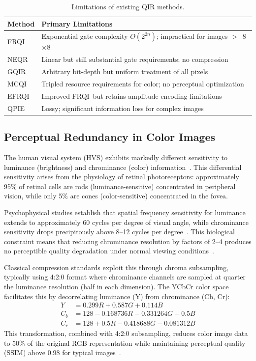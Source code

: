 \documentclass{ipol}
\newcommand{\frqi}{\textsc{FRQI}}
\newcommand{\neqr}{\textsc{NEQR}}
\newcommand{\gqir}{\textsc{GQIR}}
\newcommand{\mcqi}{\textsc{MCQI}}
\begin{document}
\begin{table}[H]
\begin{center}
\begin{tabular}{lp{5.5cm}}
\hline
Method & Primary Limitations \\
\hline
\frqi & Exponential gate complexity $O(2^{2n})$; impractical for images $>$~8$\times$8 \\
\neqr & Linear but still substantial gate requirements; no compression \\
\gqir & Arbitrary bit-depth but uniform treatment of all pixels \\
\mcqi & Tripled resource requirements for color; no perceptual optimization \\
EFRQI & Improved \frqi\ but retains amplitude encoding limitations \\
QPIE & Lossy; significant information loss for complex images \\
\hline
\end{tabular}
\caption{Limitations of existing QIR methods.}
\label{tab:existing_limitations}
\end{center}
\end{table}

\FloatBarrier
\subsection{Perceptual Redundancy in Color Images}

The human visual system (HVS) exhibits markedly different sensitivity to
luminance (brightness) and chrominance (color) information~\cite{ref7}. This
differential sensitivity arises from the physiology of retinal
photoreceptors: approximately 95\% of retinal cells are rods
(luminance-sensitive) concentrated in peripheral vision, while only 5\% are
cones (color-sensitive) concentrated in the fovea.

Psychophysical studies establish that spatial frequency sensitivity for
luminance extends to approximately 60 cycles per degree of visual angle,
while chrominance sensitivity drops precipitously above 8--12 cycles per
degree~\cite{ref21}. This biological constraint means that reducing
chrominance resolution by factors of 2--4 produces no perceptible quality
degradation under normal viewing conditions~\cite{ref36,ref57}.

Classical compression standards exploit this through chroma subsampling,
typically using 4:2:0 format where chrominance channels are sampled at
quarter the luminance resolution (half in each dimension). The YCbCr color
space facilitates this by decorrelating luminance (Y) from chrominance
(Cb, Cr):
\begin{align}
Y &= 0.299R + 0.587G + 0.114B \label{eq:y}\\
C_b &= 128 - 0.168736R - 0.331264G + 0.5B \label{eq:cb}\\
C_r &= 128 + 0.5R - 0.418688G - 0.081312B \label{eq:cr}
\end{align}
This transformation, combined with 4:2:0 subsampling, reduces color image
data to 50\% of the original RGB representation while maintaining perceptual
quality (SSIM) above 0.98 for typical images~\cite{ref22}.
\end{document}
